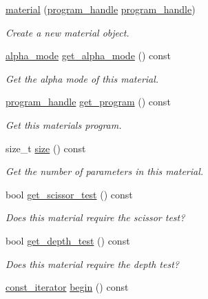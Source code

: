 \begin{DoxyCompactItemize}
\mbox{\hyperlink{classmoka_1_1material_a933c952c194f2dee5928f88370c0c1d3}{material}} (\mbox{\hyperlink{structmoka_1_1program__handle}{program\+\_\+handle}} \mbox{\hyperlink{structmoka_1_1program__handle}{program\+\_\+handle}})
\begin{DoxyCompactList}\small\item\em Create a new material object. \end{DoxyCompactList}\item 
\mbox{\hyperlink{namespacemoka_ad3e7f1428e786c2e7780186b8c0b0d81}{alpha\+\_\+mode}} \mbox{\hyperlink{classmoka_1_1material_a4e107e847f5ce6877c22a5786ecdd6ca}{get\+\_\+alpha\+\_\+mode}} () const
\begin{DoxyCompactList}\small\item\em Get the alpha mode of this material. \end{DoxyCompactList}\item 
\mbox{\hyperlink{structmoka_1_1program__handle}{program\+\_\+handle}} \mbox{\hyperlink{classmoka_1_1material_ab46309b4e7b81e050085145074e12316}{get\+\_\+program}} () const
\begin{DoxyCompactList}\small\item\em Get this material\textquotesingle{}s program. \end{DoxyCompactList}\item 
size\+\_\+t \mbox{\hyperlink{classmoka_1_1material_a30589855362a602a64c624d6f57fed3c}{size}} () const
\begin{DoxyCompactList}\small\item\em Get the number of parameters in this material. \end{DoxyCompactList}\item 
bool \mbox{\hyperlink{classmoka_1_1material_a1e08a9a97d6705e17b299c59eb590833}{get\+\_\+scissor\+\_\+test}} () const
\begin{DoxyCompactList}\small\item\em Does this material require the scissor test? \end{DoxyCompactList}\item 
bool \mbox{\hyperlink{classmoka_1_1material_a5eff610e900a4fcac9b9ff1b075e9f08}{get\+\_\+depth\+\_\+test}} () const
\begin{DoxyCompactList}\small\item\em Does this material require the depth test? \end{DoxyCompactList}\item 
\mbox{\hyperlink{classmoka_1_1material_ab87ba893c5a7741e95718b0bddbc1049}{const\+\_\+iterator}} \mbox{\hyperlink{classmoka_1_1material_a24c56dd5ee751869a0a89c4ee86df6ad}{begin}} () const

\end{DoxyCompactItemize}

